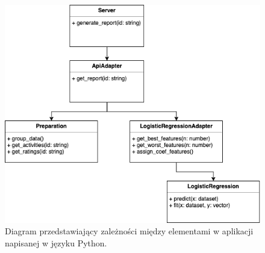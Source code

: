 \documentclass[a4paper,twoside,12pt]{book}
\begin{document}
\begin{description}
 
\begin{figure}[h!]
    \centering
    \includegraphics[width=\textwidth]{images/track_apps_ml.png}
    \caption{Diagram przedstawiający zależności między elementami w aplikacji napisanej w języku Python.\protect\footnotemark}
    \label{fig:ml_uml}
\end{figure}

\end{description}
\end{document}
